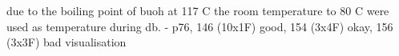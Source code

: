 due to the boiling point of \gls{buoh} at 117 C\cite{ncbi1butanol} the room temperature to 80 C were used as temperature during \gls{db}.
- p76, 146 (10x1F) good, 154 (3x4F) okay, 156 (3x3F) bad visualisation

